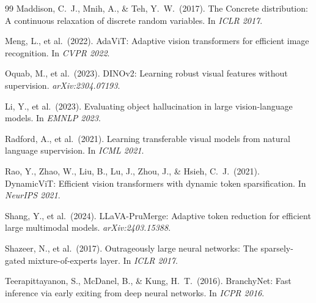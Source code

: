 \documentclass[12pt,a4paper]{article}
\begin{document}
\begin{thebibliography}{99}
Maddison, C.~J., Mnih, A., \& Teh, Y.~W.\ (2017).
\newblock The Concrete distribution: A continuous relaxation of discrete random
  variables.
\newblock In \textit{ICLR 2017}.

Meng, L., et al.\ (2022).
\newblock AdaViT: Adaptive vision transformers for efficient image recognition.
\newblock In \textit{CVPR 2022}.

Oquab, M., et al.\ (2023).
\newblock DINOv2: Learning robust visual features without supervision.
\newblock \textit{arXiv:2304.07193}.

Li, Y., et al.\ (2023).
\newblock Evaluating object hallucination in large vision-language models.
\newblock In \textit{EMNLP 2023}.

Radford, A., et al.\ (2021).
\newblock Learning transferable visual models from natural language supervision.
\newblock In \textit{ICML 2021}.

Rao, Y., Zhao, W., Liu, B., Lu, J., Zhou, J., \& Hsieh, C.~J.\ (2021).
\newblock DynamicViT: Efficient vision transformers with dynamic token
  sparsification.
\newblock In \textit{NeurIPS 2021}.

Shang, Y., et al.\ (2024).
\newblock LLaVA-PruMerge: Adaptive token reduction for efficient large
  multimodal models.
\newblock \textit{arXiv:2403.15388}.

Shazeer, N., et al.\ (2017).
\newblock Outrageously large neural networks: The sparsely-gated
  mixture-of-experts layer.
\newblock In \textit{ICLR 2017}.

Teerapittayanon, S., McDanel, B., \& Kung, H.~T.\ (2016).
\newblock BranchyNet: Fast inference via early exiting from deep neural
  networks.
\newblock In \textit{ICPR 2016}.

\end{thebibliography}
\end{document}
